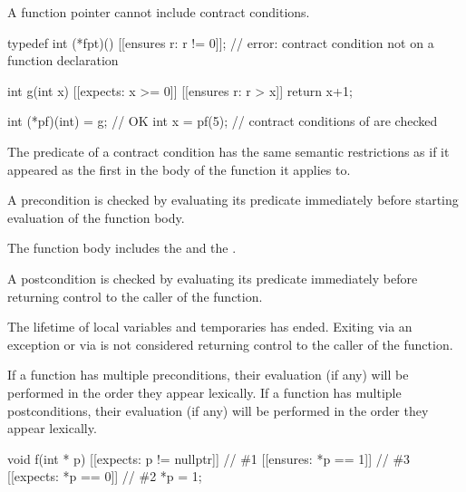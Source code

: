 \pnum
\begin{note}
A function pointer cannot include contract conditions.
\begin{example}
\begin{codeblock}
typedef int (*fpt)() [[ensures r: r != 0]];     // error: contract condition not on a function declaration

int g(int x)
  [[expects: x >= 0]]
  [[ensures r: r > x]]
{
  return x+1;
}

int (*pf)(int) = g;                             // OK
int x = pf(5);                                  // contract conditions of  are checked
\end{codeblock}
\end{example}
\end{note}

\pnum
The predicate of a contract condition has the same semantic restrictions
as if it appeared as the first 
in the body of the function it applies to.

\pnum
A precondition is checked by evaluating its predicate
immediately before starting evaluation of the function body.
\begin{note}
The function body includes
the  and
the .
\end{note}
A postcondition is checked by evaluating its predicate
immediately before returning control to the caller of the function.
\begin{note}
The lifetime of local variables and temporaries has ended.
Exiting via an exception or via 
is not considered returning control to the caller of the function.
\end{note}

\pnum
If a function has multiple preconditions,
their evaluation (if any) will be performed
in the order they appear lexically.
If a function has multiple postconditions,
their evaluation (if any) will be performed
in the order they appear lexically.
\begin{example}
\begin{codeblock}
void f(int * p)
  [[expects: p != nullptr]]                     // \#1
  [[ensures: *p == 1]]                          // \#3
  [[expects: *p == 0]]                          // \#2
{
  *p = 1;
}
\end{codeblock}
\end{example}

